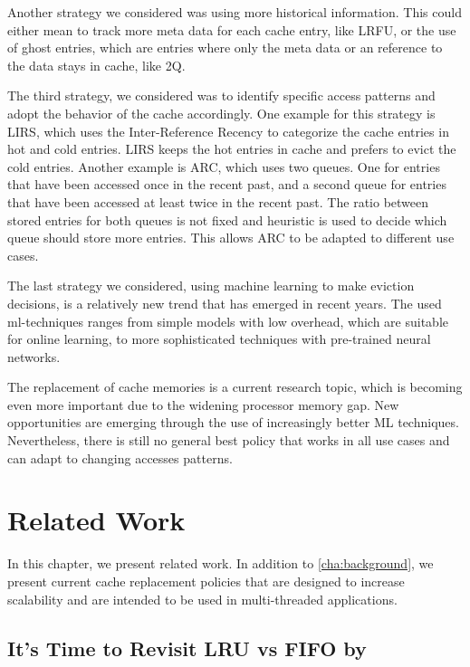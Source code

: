 \documentclass[
	12pt,
	a4paper,
	abstract,
	bibliography=totoc,
	chapterprefix,
	headings=openright,
	numbers=endperiod,
	parskip=half,
	twoside,
]{scrreprt}
\begin{document}
Another strategy we considered was using more historical information.
This could either mean to track more meta data for each cache entry, like LRFU, or the use
of ghost entries, which are entries where only the meta data or an reference to the data stays in cache, like 2Q.

The third strategy, we considered was to identify specific access patterns and adopt the behavior of the cache accordingly.
One example for this strategy is LIRS, which uses the Inter-Reference Recency to categorize the cache entries in hot and cold entries.
LIRS keeps the hot entries in cache and prefers to evict the cold entries.
Another example is ARC, which uses two queues.
One for entries that have been accessed once in the recent past, and a 
second queue for entries that have been accessed at least twice in the recent past.
The ratio between stored entries for both queues is not fixed and heuristic is used to decide which queue should store 
more entries.
This allows ARC to be adapted to different use cases.

The last strategy we considered, using machine learning to make eviction decisions, 
is a relatively new trend that has emerged in recent years.
The used ml-techniques ranges from simple models with low overhead, which are suitable for online learning, to
more sophisticated techniques with pre-trained neural networks.

The replacement of cache memories is a current research topic, which is becoming even more important 
due to the widening processor memory gap.
New opportunities are emerging through the use of increasingly better ML techniques.
Nevertheless, there is still no general best policy that works in all use cases and can adapt to changing accesses patterns.

\chapter{Related Work}
\label{cha:related work}

In this chapter, we present related work.
In addition to \cref{cha:background}, we present current cache replacement policies that are designed to increase scalability 
and are intended to be used in multi-threaded applications.

\section*{It's Time to Revisit LRU vs FIFO by \cite{eytan2020s}}
\end{document}
